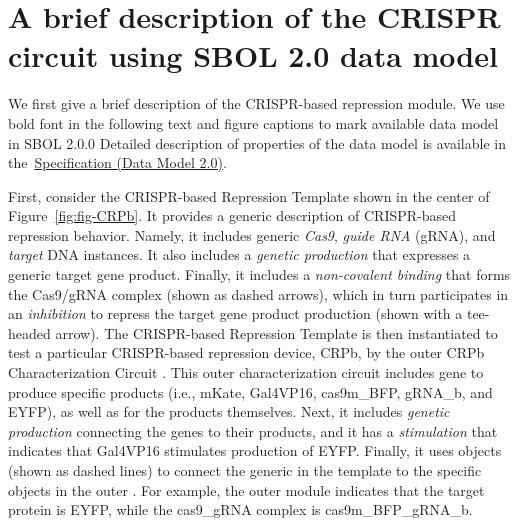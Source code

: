 \section*{A brief description of the CRISPR circuit using SBOL 2.0 data model}
We first give a brief description of the CRISPR-based repression module. We use bold font in the following text and figure captions to mark available data model in SBOL 2.0.0 Detailed description of properties of the data model is available in the~\href{http://sbolstandard.org/downloads/specification-data-model-2-0/}{Specification
  (Data Model 2.0)}.

First, consider the CRISPR-based Repression Template  shown in the center of Figure~\ref{fig:fig-CRPb}. It provides a generic description of CRISPR-based repression behavior. Namely, it includes generic \emph{Cas9}, \emph{guide RNA} (gRNA), and \emph{target} DNA  instances. It also includes a \emph{genetic production}  that expresses a generic target gene product.  Finally, it includes a \emph{non-covalent binding}  that forms the Cas9/gRNA complex (shown as dashed arrows), which in turn participates in an \emph{inhibition}  to repress the target gene product production (shown with a tee-headed arrow). The CRISPR-based Repression Template is then instantiated to test a particular CRISPR-based repression device, CRPb, by the outer CRPb Characterization Circuit .  This outer characterization circuit includes gene  to produce specific products (i.e., mKate, Gal4VP16, cas9m\_BFP, gRNA\_b, and EYFP), as well as  for the products themselves.  Next, it includes \emph{genetic production}  connecting the genes to their products, and it has a \emph{stimulation}  that indicates that Gal4VP16 stimulates production of EYFP.  Finally, it uses  objects (shown as dashed lines) to connect the generic  in the template to the specific objects in the outer .  For example, the outer module indicates that the target protein is EYFP, while the cas9\_gRNA complex is cas9m\_BFP\_gRNA\_b.

